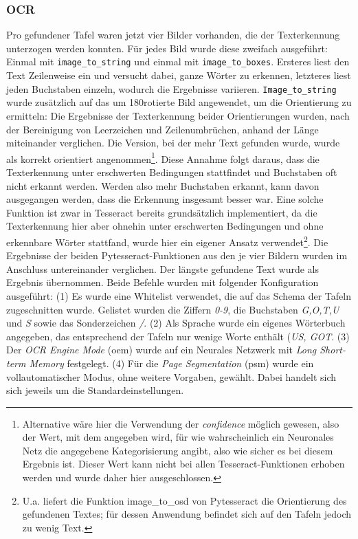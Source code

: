 \subsubsection{OCR}

Pro gefundener Tafel waren jetzt vier Bilder vorhanden, die der Texterkennung unterzogen werden konnten. Für jedes Bild wurde diese zweifach ausgeführt: Einmal mit \verb|image_to_string| und einmal mit \verb|image_to_boxes|. Ersteres liest den Text Zeilenweise ein und versucht dabei, ganze Wörter zu erkennen, letzteres liest jeden Buchstaben einzeln, wodurch die Ergebnisse variieren. \verb|Image_to_string| wurde zusätzlich auf das um 180\degree rotierte Bild angewendet, um die Orientierung zu ermitteln: Die Ergebnisse der Texterkennung beider Orientierungen wurden, nach der Bereinigung von Leerzeichen und Zeilenumbrüchen, anhand der Länge miteinander verglichen. Die Version, bei der mehr Text gefunden wurde, wurde als korrekt orientiert angenommen\footnote{Alternative wäre hier die Verwendung der \textit{confidence} möglich gewesen, also der Wert, mit dem angegeben wird, für wie wahrscheinlich ein Neuronales Netz die angegebene Kategorisierung angibt, also wie sicher es bei diesem Ergebnis ist. Dieser Wert kann nicht bei allen Tesseract-Funktionen erhoben werden und wurde daher hier ausgeschlossen.}. Diese Annahme folgt daraus, dass die Texterkennung unter erschwerten Bedingungen stattfindet und Buchstaben oft nicht erkannt werden. Werden also mehr Buchstaben erkannt, kann davon ausgegangen werden, dass die Erkennung insgesamt besser war. Eine solche Funktion ist zwar in Tesseract bereits grundsätzlich implementiert, da die Texterkennung hier aber ohnehin unter erschwerten Bedingungen und ohne erkennbare Wörter stattfand, wurde hier ein eigener Ansatz verwendet\footnote{U.a. liefert die Funktion image\_to\_osd von Pytesseract die Orientierung des gefundenen Textes; für dessen Anwendung befindet sich auf den Tafeln jedoch zu wenig Text.}.
Die Ergebnisse der beiden Pytesseract-Funktionen aus den je vier Bildern wurden im Anschluss untereinander verglichen. Der längste gefundene Text wurde als Ergebnis übernommen.
Beide Befehle wurden mit folgender Konfiguration ausgeführt: (1) Es wurde eine Whitelist verwendet, die auf das Schema der Tafeln zugeschnitten wurde. Gelistet wurden die Ziffern \textit{0-9}, die Buchstaben \textit{G,O,T,U} und \textit{S} sowie das Sonderzeichen \textit{/}. (2) Als Sprache wurde ein eigenes Wörterbuch angegeben, das entsprechend der Tafeln nur wenige Worte enthält (\textit{US, GOT}. (3) Der \textit{OCR Engine Mode} (oem) wurde auf ein Neurales Netzwerk mit \textit{Long Short-term Memory} \cite{hochreitersepp}{} festgelegt. (4) Für die \textit{Page Segmentation} (psm) wurde ein vollautomatischer Modus, ohne weitere Vorgaben, gewählt. Dabei handelt sich sich jeweils um die Standardeinstellungen.

